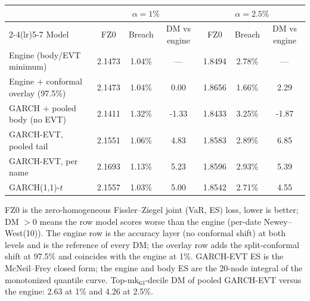 \begin{tabular}{lcccccc}
\toprule
& \multicolumn{3}{c}{$\alpha=1\%$} & \multicolumn{3}{c}{$\alpha=2.5\%$} \\
\cmidrule(lr){2-4}\cmidrule(lr){5-7}
Model & FZ0 & Breach & DM vs engine & FZ0 & Breach & DM vs engine \\
\midrule
Engine (body/EVT minimum) & 2.1473 & 1.04\% & --- & 1.8494 & 2.78\% & --- \\
Engine $+$ conformal overlay (97.5\%) & 2.1473 & 1.04\% & 0.00 & 1.8656 & 1.66\% & 2.29 \\
GARCH $+$ pooled body (no EVT) & 2.1411 & 1.32\% & -1.33 & 1.8433 & 3.25\% & -1.87 \\
GARCH-EVT, pooled tail & 2.1551 & 1.06\% & 4.83 & 1.8583 & 2.89\% & 6.85 \\
GARCH-EVT, per name & 2.1693 & 1.13\% & 5.23 & 1.8596 & 2.93\% & 5.39 \\
GARCH(1,1)-$t$ & 2.1557 & 1.03\% & 5.00 & 1.8542 & 2.71\% & 4.55 \\
\bottomrule
\end{tabular}
\begin{tablenotes}\footnotesize
\item FZ0 is the zero-homogeneous Fissler--Ziegel joint (VaR, ES) loss, lower is better; DM $>0$ means the row model scores worse than the engine (per-date Newey--West(10)). The engine row is the accuracy layer (no conformal shift) at both levels and is the reference of every DM; the overlay row adds the split-conformal shift at 97.5\% and coincides with the engine at 1\%. GARCH-EVT ES is the McNeil--Frey closed form; the engine and body ES are the 20-node integral of the monotonized quantile curve. Top-$\mathrm{mk}_{63}$-decile DM of pooled GARCH-EVT versus the engine: 2.63 at 1\% and 4.26 at 2.5\%.
\end{tablenotes}
